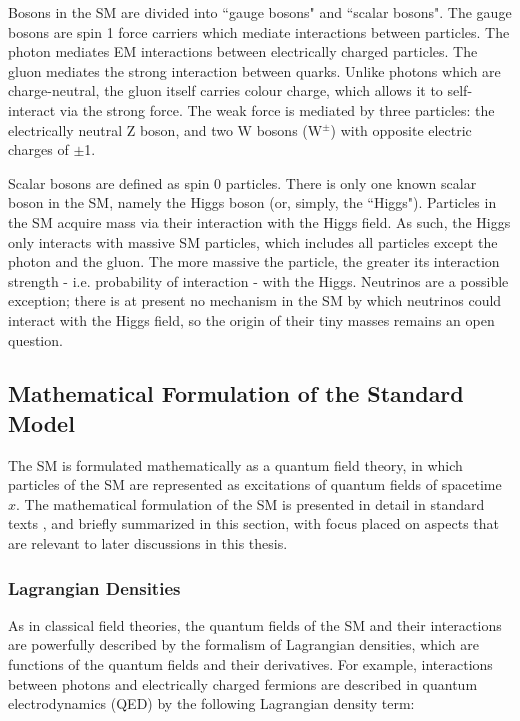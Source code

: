 Bosons in the SM are divided into ``gauge bosons" and ``scalar bosons". The gauge bosons are spin 1 force carriers which mediate interactions between particles. The photon mediates EM interactions between electrically charged particles. The gluon mediates the strong interaction between quarks. Unlike photons which are charge-neutral, the gluon itself carries colour charge, which allows it to self-interact via the strong force. The weak force is mediated by three particles: the electrically neutral Z boson, and two W bosons (W$^\pm$) with opposite electric charges of $\pm$1. 

Scalar bosons are defined as spin 0 particles. There is only one known scalar boson in the SM, namely the Higgs boson (or, simply, the ``Higgs"). Particles in the SM acquire mass via their interaction with the Higgs field. As such, the Higgs only interacts with massive SM particles, which includes all particles except the photon and the gluon. The more massive the particle, the greater its interaction strength - i.e. probability of interaction - with the Higgs. Neutrinos are a possible exception; there is at present no mechanism in the SM by which neutrinos could interact with the Higgs field, so the origin of their tiny masses remains an open question.  

\subsection{Mathematical Formulation of the Standard Model}

The SM is formulated mathematically as a quantum field theory, in which particles of the SM are represented as excitations of quantum fields of spacetime \(x\). The mathematical formulation of the SM is presented in detail in standard texts \cite{griffiths_2008, SM_intro}, and briefly summarized in this section, with focus placed on aspects that are relevant to later discussions in this thesis.

\subsubsection{Lagrangian Densities}

As in classical field theories, the quantum fields of the SM and their interactions are powerfully described by the formalism of Lagrangian densities, which are functions of the quantum fields and their derivatives. For example, interactions between photons and electrically charged fermions are described in quantum electrodynamics (QED) by the following Lagrangian density term:

